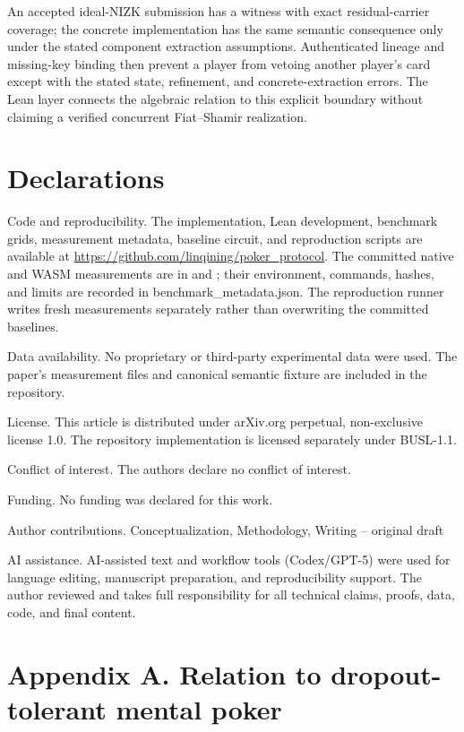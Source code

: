 \documentclass[11pt]{article}
\begin{document}
An accepted ideal-NIZK submission has a witness with exact residual-carrier coverage; the concrete implementation has the same semantic consequence only under the stated component extraction assumptions. Authenticated lineage and missing-key binding then prevent a player from vetoing another player’s card except with the stated state, refinement, and concrete-extraction errors. The Lean layer connects the algebraic relation to this explicit boundary without claiming a verified concurrent Fiat–Shamir realization.

\section{Declarations}

Code and reproducibility. The implementation, Lean development, benchmark grids, measurement metadata, baseline circuit, and reproduction scripts are available at \url{https://github.com/linqining/poker_protocol}. The committed native and WASM measurements are in  and ; their environment, commands, hashes, and limits are recorded in benchmark\_metadata.json. The reproduction runner writes fresh measurements separately rather than overwriting the committed baselines.

Data availability. No proprietary or third-party experimental data were used. The paper’s measurement files and canonical semantic fixture are included in the repository.

License. This article is distributed under arXiv.org perpetual, non-exclusive license 1.0. The repository implementation is licensed separately under BUSL-1.1.

Conflict of interest. The authors declare no conflict of interest.

Funding. No funding was declared for this work.

Author contributions. Conceptualization, Methodology, Writing – original draft

AI assistance. AI-assisted text and workflow tools (Codex/GPT-5) were used for language editing, manuscript preparation, and reproducibility support. The author reviewed and takes full responsibility for all technical claims, proofs, data, code, and final content.

\section{Appendix A. Relation to dropout-tolerant mental poker}
\end{document}
